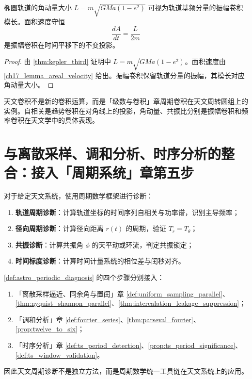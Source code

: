 \begin{proposition}[角动量与振幅卷积]\label{prop:astro_angular_momentum_phase}
椭圆轨道的角动量大小 \(L=m\sqrt{GMa(1-e^2)}\) 可视为轨道基频分量的振幅卷积模长。面积速度守恒
\[
\frac{dA}{dt}=\frac{L}{2m}
\]
是振幅卷积在时间平移下的不变投影。
\end{proposition}

\begin{proof}
由 \cref{thm:kepler_third} 证明中 \(L=m\sqrt{GMa(1-e^2)}\)。面积速度由 \cref{ch17_lemma_areal_velocity} 给出。振幅卷积保留轨道分量的振幅，其模长对应角动量大小。
\end{proof}

\begin{remark}[天文卷积与周期卷积的关系]\label{rem:astro_convolution_relation}
天文卷积不是新的卷积运算，而是「级数与卷积」章周期卷积在天文周转圆组上的实例。自相关是趋势卷积在对角线上的投影，角动量、共振比分别是振幅卷积和频率卷积在天文学中的具体表现。
\end{remark}

\section{与离散采样、调和分析、时序分析的整合：接入「周期系统」章第五步}
\label{sec:astro_integration}

\begin{definition}[天文周期诊断流程]\label{def:astro_periodic_diagnosis}
对于给定天文系统，使用周期数学框架进行诊断：
\begin{enumerate}[label=(\roman*)]
    \item \textbf{轨道周期诊断}：计算轨道坐标的时间序列自相关与功率谱，识别主导频率；
    \item \textbf{径向周期诊断}：计算径向距离 \(r(t)\) 的周期，验证 \(T_r=T_\theta\)；
    \item \textbf{共振诊断}：计算共振角 \(\phi\) 的天平动或环流，判定共振锁定；
    \item \textbf{时间标度诊断}：计算时间计量系统的相位差与闰秒对齐。
\end{enumerate}
\end{definition}

\begin{theorem}[天文周期诊断流程与三章接口]\label{thm:astro_diagnosis_integration}
\cref{def:astro_periodic_diagnosis} 的四个步骤分别接入：
\begin{enumerate}[label=(\roman*)]
    \item 「离散采样逼近、同余角与置闰」章 \cref{def:uniform_sampling_parallel}、\cref{thm:nyquist_shannon_parallel}、\cref{thm:intercalation_leakage_suppression}；
    \item 「调和分析」章 \cref{def:fourier_series}、\cref{thm:parseval_fourier}、\cref{prop:twelve_to_six}；
    \item 「时序分析」章 \cref{def:ts_period_detection}、\cref{prop:ts_period_significance}、\cref{def:ts_window_validation}。
\end{enumerate}
因此天文周期诊断不是独立方法，而是周期数学统一工具链在天文系统上的应用。
\end{theorem}

